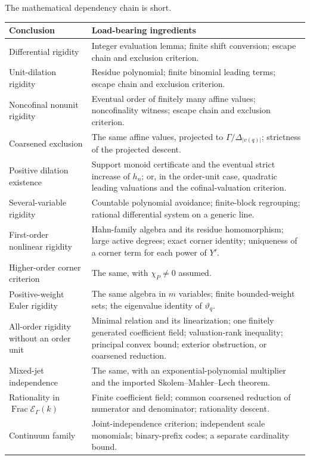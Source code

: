 \documentclass[11pt]{article}
\numberwithin{equation}{section}
\theoremstyle{definition}
\theoremstyle{remark}
\newcommand{\abs}[1]{\lvert#1\rvert}
\newcommand{\EK}{\mathcal E_\Gamma(k)}
\newcommand{\FE}{\operatorname{Frac}\EK}
\begin{document}
The mathematical dependency chain is short.
\begin{longtable}{@{}>{\raggedright\arraybackslash}p{}
                    >{\raggedright\arraybackslash}p{}@{}}
\toprule
Conclusion & Load-bearing ingredients\\
\midrule
\endhead
Differential rigidity & Integer evaluation lemma; finite shift conversion;
escape chain and exclusion criterion.\\
Unit-dilation rigidity & Residue polynomial; finite binomial leading terms;
escape chain and exclusion criterion.\\
Noncofinal nonunit rigidity & Eventual order of finitely many affine values;
noncofinality witness; escape chain and exclusion criterion.\\
Coarsened exclusion & The same affine values, projected to
$\Gamma/\Delta_{\abs{v(q)}}$; strictness of the projected descent.\\
Positive dilation existence & Support monoid certificate and the eventual
strict increase of $h_n$; or, in the order-unit case, quadratic leading
valuations and the cofinal-valuation criterion.\\
Several-variable rigidity & Countable polynomial avoidance; finite-block
regrouping; rational differential system on a generic line.\\
First-order nonlinear rigidity & Hahn-family algebra and its residue
homomorphism; large active degrees; exact corner identity; uniqueness of a
corner term for each power of $Y'$.\\
Higher-order corner criterion & The same, with $\chi_P\ne0$ assumed.\\
Positive-weight Euler rigidity & The same algebra in $m$ variables; finite
bounded-weight sets; the eigenvalue identity of $\vartheta_q$.\\
All-order rigidity without an order unit & Minimal relation and its
linearization; one finitely generated coefficient field;
valuation-rank inequality; principal convex bound; exterior obstruction, or
coarsened reduction.\\
Mixed-jet independence & The same, with an exponential-polynomial multiplier
and the imported Skolem--Mahler--Lech theorem.\\
Rationality in $\FE$ & Finite coefficient field; common coarsened reduction of
numerator and denominator; rationality descent.\\
Continuum family & Joint-independence criterion; independent scale
monomials; binary-prefix codes; a separate cardinality bound.\\

\end{longtable}
\end{document}

